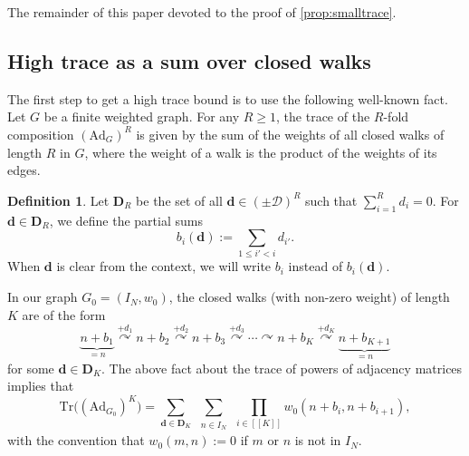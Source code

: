 \documentclass[11pt]{amsart}
\theoremstyle{definition}
\newtheorem{definition}[theorem]{Definition}
\renewcommand{\leq}{\leqslant}
\renewcommand{\geq}{\geqslant}
\newcommand{\sinterval}[1]{[\![#1]\!] }
\newcommand{\Ad}{\mathrm{Ad}}
\newcommand{\Tr}{\mathrm{Tr}}
\newcommand{\N}{I_N}
\newcommand{\D}{\mathcal{D}}
\renewcommand{\d}{\boldsymbol{d}}
\newcommand{\graph}{G}
\newcommand{\sommespart}{b}
\newcommand{\fancyD}{\mathbf{D}}
\newcommand{\Dsf}{\fancyD_{\!\repK}}
\newcommand{\DsfR}{\fancyD_{\!\tupsize}}
\newcommand{\repK}{K}
\newcommand{\newK}{\sinterval{K}}
\newcommand{\tupsize}{R}
\begin{document}
The remainder of this paper devoted to the proof of \cref{prop:smalltrace}.

\subsection{High trace as a sum over closed walks}

The first step to get a high trace bound is to use the following well-known fact. Let $G$ be a finite weighted graph. For any $\tupsize\geq 1$, the trace of the $\tupsize$-fold composition $(\Ad_G)^{\tupsize}$ is given by the sum of the weights of all closed walks of length $\tupsize$ in $G$, where the weight of a walk is the product of the weights of its edges. 

\begin{definition}%
\label{lem:defDsf}
Let $\DsfR$ be the set of all $\d \in (\pm \D)^{\tupsize}$ such that $\sum_{i=1}^{\tupsize} d_i= 0$. For $\d\in \DsfR$, we define the partial sums
\begin{equation}
\label{eq:defBeta}
\sommespart_i(\d) := \sum_{1\leq i'<i }d_{i'}.
\end{equation}
When $\d$ is clear from the context, we will write $\sommespart_i$ instead of $\sommespart_i(\d)$.
\end{definition}

In our graph $\graph_0 = (\N, w_0)$, the closed walks (with non-zero weight) of length $\repK$ are of the form
\begin{equation*}
\underbrace{n+\sommespart_1}_{=n} \stackrel{+d_1}{\curvearrowright} n+\sommespart_2 \stackrel{+d_2}{\curvearrowright} n+\sommespart_3 \stackrel{+d_3}{\curvearrowright} \cdots \curvearrowright n+\sommespart_{\repK} \stackrel{+d_{\repK}}{\curvearrowright} \underbrace{n+\sommespart_{\repK+1}}_{= n}
\end{equation*}
for some $\d\in \Dsf$. The above fact about the trace of powers of adjacency matrices implies that
\begin{equation}
\label{eq:traceexpression}
\Tr \big((\Ad_{\graph_0})^{\repK}\big) = \sum_{\d\in \Dsf} \,  \sum_{\substack{n\in \N}} \, 
\prod_{i\in \newK} w_0(n+\sommespart_i, n+\sommespart_{i+1}),
\end{equation}
with the convention that $w_0(m,n) := 0$ if $m$ or $n$ is not in $\N$.








\end{document}
